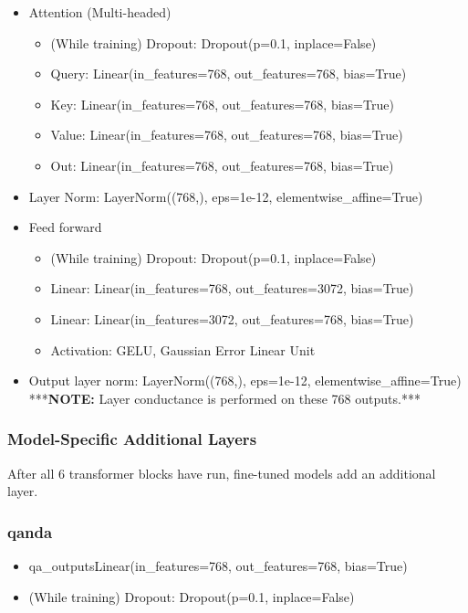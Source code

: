 \documentclass{article}
\begin{document}
\begin{itemize}
\begin{itemize}
\begin{itemize}
\item Attention (Multi-headed)
\begin{itemize}
\item (While training) Dropout: Dropout(p=0.1, inplace=False)
\item Query: Linear(in\_features=768, out\_features=768, bias=True)
\item Key: Linear(in\_features=768, out\_features=768, bias=True)
\item Value: Linear(in\_features=768, out\_features=768, bias=True)
\item Out: Linear(in\_features=768, out\_features=768, bias=True)
\end{itemize}
\item Layer Norm: LayerNorm((768,), eps=1e-12, elementwise\_affine=True)
\item Feed forward
\begin{itemize}
\item (While training) Dropout: Dropout(p=0.1, inplace=False)
\item Linear: Linear(in\_features=768, out\_features=3072, bias=True)
\item Linear: Linear(in\_features=3072, out\_features=768, bias=True)
\item Activation: GELU, Gaussian Error Linear Unit
\end{itemize}
\item Output layer norm: LayerNorm((768,), eps=1e-12, elementwise\_affine=True) \\
***\textbf{NOTE:} Layer conductance is performed on these 768 outputs.***
\end{itemize}
\end{itemize}
\end{itemize}

\subsubsection{Model-Specific Additional Layers}

After all $6$ transformer blocks have run, fine-tuned models add an additional layer.

\subsubsection*{qanda}

\begin{itemize}
\item qa\_outputsLinear(in\_features=768, out\_features=768, bias=True)
\item (While training) Dropout: Dropout(p=0.1, inplace=False)
\end{itemize}
\end{document}
